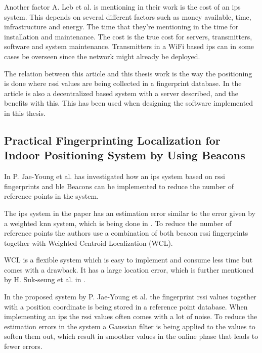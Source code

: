 \bigskip

Another factor A. Leb et al. is mentioning in their work is the cost of an \acrshort{ips} system.
This depends on several different factors such as money available, time, infrastructure and energy.
The time that they're mentioning in the time for installation and maintenance.
The cost is the true cost for servers, transmitters, software and system maintenance.
Transmitters in a WiFi based \acrshort{ips} can in some cases be overseen since the network might already be deployed.

\bigskip

The relation between this article and this thesis work is the way the positioning is done where \acrshort{rssi} values are being collected in a fingerprint database.
In the article is also a decentralized based system with a server described, and the benefits with this.
This has been used when designing the software implemented in this thesis.


\subsection{Practical Fingerprinting Localization for Indoor Positioning System by Using Beacons}\label{sec:}
In \cite{PracticalFingerprintingLocalization2017} P. Jae-Young et al. has investigated how an \acrshort{ips} system based on \acrshort{rssi} fingerprints and \acrshort{ble} Beacons can be implemented to reduce the number of reference points in the system.

\bigskip

The \acrshort{ips} system in the paper has an estimation error similar to the  error given by a weighted \acrshort{knn} system, which is being done in \cite{ImprovingIndoorLocalization2016}.
To reduce the number of reference points the authors use a combination of both beacon \acrshort{rssi} fingerprints together with Weighted Centroid Localization (WCL). 

\bigskip

WCL is a flexible system which is easy to implement and consume less time but comes with a drawback. 
It has a large location error, which is further mentioned by H. Suk-seung et al. in \cite{BeaconBasedIndoor2016}.

\bigskip

In the proposed system by P. Jae-Young et al. the fingerprint \acrshort{rssi} values together with a position coordinate is being stored in a reference point database.
When implementing an \acrshort{ips} the \acrshort{rssi} values often comes with a lot of noise.
To reduce the estimation errors in the system a Gaussian filter is being applied to the values to soften them out, which result in smoother values in the online phase that leads to fewer errors.  

